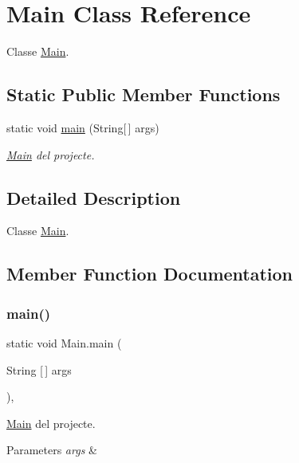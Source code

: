 \hypertarget{classMain}{}\section{Main Class Reference}
\label{classMain}


Classe \hyperlink{classMain}{Main}.  


\subsection*{Static Public Member Functions}
\begin{DoxyCompactItemize}
\item 
static void \hyperlink{classMain_a8a5d0f827edddff706cc0e6740d0579a}{main} (String\mbox{[}$\,$\mbox{]} args)
\begin{DoxyCompactList}\small\item\em \hyperlink{classMain}{Main} del projecte. \end{DoxyCompactList}\end{DoxyCompactItemize}


\subsection{Detailed Description}
Classe \hyperlink{classMain}{Main}. 

\subsection{Member Function Documentation}
\mbox{\label{classMain_a8a5d0f827edddff706cc0e6740d0579a}} 
\subsubsection{\texorpdfstring{main()}{main()}}
{\footnotesize\ttfamily static void Main.\+main (\begin{DoxyParamCaption}\item[{String \mbox{[}$\,$\mbox{]}}]{args }\end{DoxyParamCaption})\hspace{0.3cm}{\ttfamily [inline]}, {\ttfamily [static]}}



\hyperlink{classMain}{Main} del projecte. 


\begin{DoxyParams}{Parameters}
{\em args} & \\
\hline
\end{DoxyParams}

